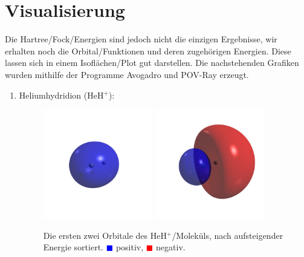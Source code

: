 \section{Visualisierung}
Die Hartree\-/Fock\-/Energien sind jedoch nicht die einzigen Ergebnisse,
wir erhalten noch die Orbital\-/Funktionen und deren zugehörigen Energien.
Diese lassen sich in einem Isoflächen\-/Plot gut darstellen.
Die nachstehenden Grafiken wurden mithilfe der Programme Avogadro \cite{avogadro}
und POV-Ray \cite{povray} erzeugt.
\begin{enumerate}
\item Heliumhydridion (HeH$^+$):
\begin{figure}[H]
\centering
\includegraphics[trim=300 300 300 300, clip, width=0.45\textwidth]{res/HeH/heh_w0.png}
\includegraphics[trim=300 300 300 300, clip, width=0.45\textwidth]{res/HeH/heh_w1.png}
\caption{Die ersten zwei Orbitale des HeH$^+$\-/Moleküls,
nach aufsteigender Energie sortiert.
\textcolor{blue}{$\blacksquare$} positiv,
\textcolor{red}{$\blacksquare$} negativ.}\label{heh_orbitals}
\end{figure}


\end{enumerate}
